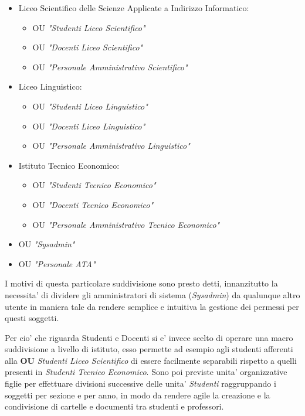 \documentclass{report}
\begin{document}
            \begin{itemize}
                \item Liceo Scientifico delle Scienze Applicate a Indirizzo Informatico:
                    \begin{itemize}
                        \item OU \textit{"Studenti Liceo Scientifico"}
                        \item OU \textit{"Docenti Liceo Scientifico"}
                        \item OU \textit{"Personale Amministrativo Scientifico"}
                    \end{itemize}
                \item Liceo Linguistico:
                    \begin{itemize}
                        \item OU \textit{"Studenti Liceo Linguistico"}
                        \item OU \textit{"Docenti Liceo Linguistico"}
                        \item OU \textit{"Personale Amministrativo Linguistico"}
                    \end{itemize}
                \item Istituto Tecnico Economico:
                    \begin{itemize}
                        \item OU \textit{"Studenti Tecnico Economico"}
                        \item OU \textit{"Docenti Tecnico Economico"}
                        \item OU \textit{"Personale Amministrativo Tecnico Economico"}
                    \end{itemize}
                    \item OU \textit{"Sysadmin"}
                    \item OU \textit{"Personale ATA"}
            \end{itemize}
            I motivi di questa particolare suddivisione sono presto detti, innanzitutto la  necessita' di dividere 
             gli amministratori di sistema (\emph{Sysadmin}) da qualunque altro utente in maniera tale da rendere 
             semplice e intuitiva la gestione dei permessi per questi soggetti.

            Per cio' che riguarda Studenti e Docenti si e' invece scelto di operare una macro suddivisione a livello 
             di istituto, esso permette ad esempio agli studenti afferenti alla \textbf{OU} \emph{Studenti Liceo Scientifico}
             di essere facilmente separabili rispetto a quelli presenti in \emph{Studenti Tecnico Economico}. Sono
             poi previste unita' organizzative figlie per effettuare divisioni successive delle unita' \emph{Studenti}
             raggruppando i soggetti per sezione e per anno, in modo da rendere agile la creazione e la condivisione di
             cartelle e documenti tra studenti e professori.
\end{document}
